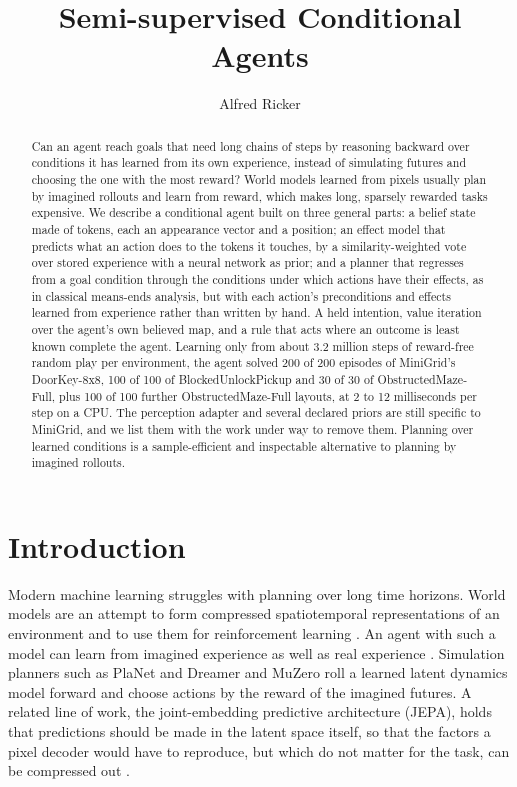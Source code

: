 \documentclass{article}
\title{Semi-supervised Conditional Agents}
\author{Alfred Ricker}
\date{}
\begin{document}
\maketitle

\begin{abstract}
Can an agent reach goals that need long chains of steps by reasoning backward over conditions it has learned from its own experience, instead of simulating futures and choosing the one with the most reward? World models learned from pixels usually plan by imagined rollouts and learn from reward, which makes long, sparsely rewarded tasks expensive. We describe a conditional agent built on three general parts: a belief state made of tokens, each an appearance vector and a position; an effect model that predicts what an action does to the tokens it touches, by a similarity-weighted vote over stored experience with a neural network as prior; and a planner that regresses from a goal condition through the conditions under which actions have their effects, as in classical means-ends analysis, but with each action's preconditions and effects learned from experience rather than written by hand. A held intention, value iteration over the agent's own believed map, and a rule that acts where an outcome is least known complete the agent. Learning only from about 3.2 million steps of reward-free random play per environment, the agent solved 200 of 200 episodes of MiniGrid's DoorKey-8x8, 100 of 100 of BlockedUnlockPickup and 30 of 30 of ObstructedMaze-Full, plus 100 of 100 further ObstructedMaze-Full layouts, at 2 to 12 milliseconds per step on a CPU. The perception adapter and several declared priors are still specific to MiniGrid, and we list them with the work under way to remove them. Planning over learned conditions is a sample-efficient and inspectable alternative to planning by imagined rollouts.
\end{abstract}


\section{Introduction}

Modern machine learning struggles with planning over long time horizons. World models are an attempt to form compressed spatiotemporal representations of an environment and to use them for reinforcement learning \cite{Schmidhuber1990,Ha2018}. An agent with such a model can learn from imagined experience as well as real experience \cite{Sutton1991}. Simulation planners such as PlaNet and Dreamer \cite{Hafner2019,Hafner2020,Hafner2025} and MuZero \cite{Schrittwieser2020} roll a learned latent dynamics model forward and choose actions by the reward of the imagined futures. A related line of work, the joint-embedding predictive architecture (JEPA), holds that predictions should be made in the latent space itself, so that the factors a pixel decoder would have to reproduce, but which do not matter for the task, can be compressed out \cite{LeCun2022,Assran2023}.
\end{document}

